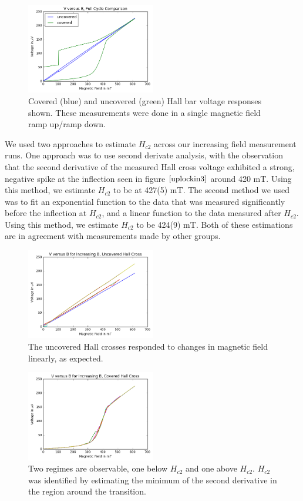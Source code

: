 \documentclass[twocolumn,aps,prl]{revtex4-1} %
\begin{document}
\begin{figure}
\includegraphics[width=0.5\textwidth]{FullCycleImage.png}
\caption{Covered (blue) and uncovered (green) Hall bar voltage responses shown. These measurements were done in a single magnetic field ramp up/ramp down.}
\label{FCS}
\end{figure}

We used two approaches to estimate $H_{c2}$ across our increasing field measurement runs. One approach was to use second derivate analysis, with the observation that the second derivative of the measured Hall cross voltage exhibited a strong, negative spike at the inflection seen in figure $\ref{uplockin3}$ around 420 mT. Using this method, we estimate $H_{c2}$ to be at 427(5) mT. The second method we used was to fit an exponential function to the data that was measured significantly before the inflection at $H_{c2}$, and a linear function to the data measured after $H_{c2}$. Using this method, we estimate $H_{c2}$ to be 424(9) mT. Both of these estimations are in agreement with measurements made by other groups. \cite{NbSupProp}


\begin{figure}
\includegraphics[width=0.5\textwidth]{UncoveredUpSweep.png}
\caption{The uncovered Hall crosses responded to changes in magnetic field linearly, as expected.}
\label{uplockin1}
\end{figure}

\begin{figure}
\includegraphics[width=0.5\textwidth]{CoveredUpSweep.png}
\caption{Two regimes are observable, one below $H_{c2}$ and one above $H_{c2}$. $H_{c2}$ was identified by estimating the minimum of the second derivative in the region around the transition.}
\label{uplockin3}
\end{figure}
\end{document}

